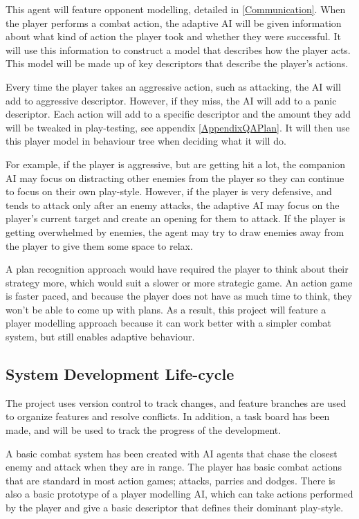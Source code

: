 \documentclass{IEEEtran}
\begin{document}
This agent will feature opponent modelling, detailed in \ref{Communication}. When the player performs a combat action, the adaptive AI will be given information about what kind of action the player took and whether they were successful. It will use this information to construct a model that describes how the player acts. This model will be made up of key descriptors that describe the player's actions.

Every time the player takes an aggressive action, such as attacking, the AI will add to aggressive descriptor. However, if they miss, the AI will add to a panic descriptor. Each action will add to a specific descriptor and the amount they add will be tweaked in play-testing, see appendix \ref{AppendixQAPlan}. It will then use this player model in behaviour tree when deciding what it will do.

For example, if the player is aggressive, but are getting hit a lot, the companion AI may focus on distracting other enemies from the player so they can continue to focus on their own play-style. However, if the player is very defensive, and tends to attack only after an enemy attacks, the adaptive AI may focus on the player's current target and create an opening for them to attack. If the player is getting overwhelmed by enemies, the agent may try to draw enemies away from the player to give them some space to relax.

A plan recognition approach would have required the player to think about their strategy more, which would suit a slower or more strategic game. An action game is faster paced, and because the player does not have as much time to think, they won't be able to come up with plans. As a result, this project will feature a player modelling approach because it can work better with a simpler combat system, but still enables adaptive behaviour.

\subsection{System Development Life-cycle}
\label{DevLifecycle}

The project uses version control to track changes, and feature branches are used to organize features and resolve conflicts. In addition, a task board has been made, and will be used to track the progress of the development.

A basic combat system has been created with AI agents that chase the closest enemy and attack when they are in range. The player has basic combat actions that are standard in most action games; attacks, parries and dodges. There is also a basic prototype of a player modelling AI, which can take actions performed by the player and give a basic descriptor that defines their dominant play-style.
\end{document}
